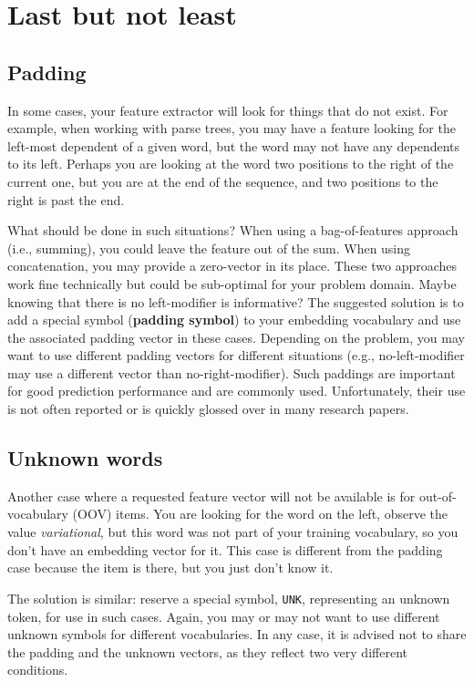 \section{Last but not least}
\subsection{Padding}
In some cases, your feature extractor will look for things that do not exist. For example, when working with parse trees, you may have a feature looking for the left-most dependent of a given word, but the word may not have any dependents to its left. Perhaps you are looking at the word two positions to the right of the current one, but you are at the end of the sequence, and two positions to the right is past the end.

What should be done in such situations? When using a bag-of-features approach (i.e., summing), you could leave the feature out of the sum. When using concatenation, you may provide a zero-vector in its place. These two approaches work fine technically but could be sub-optimal for your problem domain. Maybe knowing that there is no left-modifier is informative? The suggested solution is to add a special symbol (\textbf{padding symbol}) to your embedding vocabulary and use the associated padding vector in these cases. Depending on the problem, you may want to use different padding vectors for different situations (e.g., no-left-modifier may use a different vector than no-right-modifier). Such paddings are important for good prediction performance and are commonly used. Unfortunately, their use is not often reported or is quickly glossed over in many research papers.

\subsection{Unknown words}
Another case where a requested feature vector will not be available is for out-of-vocabulary (OOV) items. You are looking for the word on the left, observe the value \textit{variational}, but this word was not part of your training vocabulary, so you don’t have an embedding vector for it. This case is different from the padding case because the item is there, but you just don’t know it. 

The solution is similar: reserve a special symbol, \texttt{UNK}, representing an unknown token, for use in such cases. Again, you may or may not want to use different unknown symbols for different vocabularies. In any case, it is advised not to share the padding and the unknown vectors, as they reflect two very different conditions.

